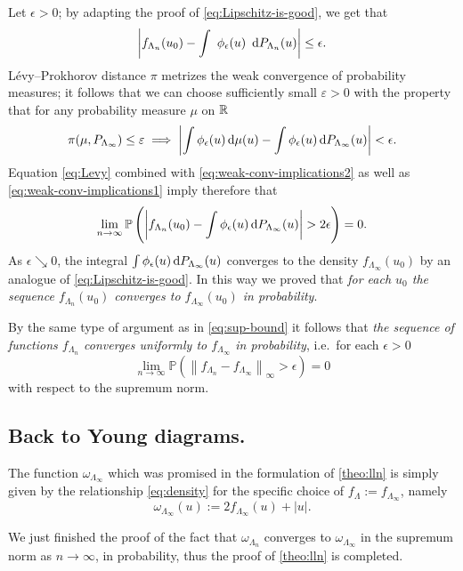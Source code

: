 \documentclass[12pt,usenames,dvipsnames,svgnames,table]{amsart}
\begin{document}
\medskip

Let $\epsilon>0$; by adapting the proof of \eqref{eq:Lipschitz-is-good}, we get that
\begin{equation}
\label{eq:weak-conv-implications1}
\left| f_{\Lambda_n}(u_0) - \int\ \phi_\epsilon(u)\ \dif  P_{\Lambda_n}(u) \right| 
\leq \epsilon.  
\end{equation}
Lévy--Prokhorov distance $\pi$ metrizes the weak convergence of probability measures;
it follows that we can choose sufficiently small $\varepsilon>0$ 
with the property that for any probability measure
$\mu$ on $\mathbb{R}$
\begin{equation}
\label{eq:weak-conv-implications2}
\pi(\mu, P_{\Lambda_\infty})\leq \varepsilon \implies 
\left| \int \phi_\epsilon(u) \dif \mu(u)-  \int \phi_\epsilon(u) \dif P_{\Lambda_\infty}(u) \right| <\epsilon.
\end{equation}
Equation \eqref{eq:Levy} combined with \eqref{eq:weak-conv-implications2}
as well as \eqref{eq:weak-conv-implications1}
imply therefore that
\[ \lim_{n\to\infty} 
\mathbb{P} \left( \left| f_{\Lambda_n}(u_0) - \int \phi_\epsilon(u) \dif P_{\Lambda_\infty}(u) \right| > 2\epsilon
\right) = 0.
\]
As $\epsilon\searrow 0$, the integral $\int \phi_\epsilon(u) \dif P_{\Lambda_\infty}(u) $ 
converges to the density $f_{\Lambda_\infty}(u_0)$ by an analogue of \eqref{eq:Lipschitz-is-good}.
In this way we proved that \emph{for each $u_0$ 
	the sequence $f_{\Lambda_n}(u_0)$ converges to
	$f_{\Lambda_\infty}(u_0)$ in probability}.

By the same type of argument as in \eqref{eq:sup-bound}
it follows that 
\emph{the sequence of functions $f_{\Lambda_n}$ converges uniformly to $f_{\Lambda_\infty}$ in probability}, 
i.e.~for each $\epsilon>0$
\[\lim_{n\to\infty} \mathbb{P} \left( \left\| f_{\Lambda_n} - f_{\Lambda_\infty} \right\|_{\infty} > \epsilon \right) = 0 \]
with respect to the supremum norm.

\subsection{Back to Young diagrams.}
The function $\omega_{\Lambda_\infty}$ which was promised in the formulation of \cref{theo:lln}
is simply given by the relationship \eqref{eq:density} for the specific choice of 
$f_{\Lambda}:=f_{\Lambda_\infty}$, namely
\[ \omega_{\Lambda_\infty}(u):= 2 f_{\Lambda_\infty}(u) + |u|.\]

We just finished the proof of
the fact that $\omega_{\Lambda_n}$ converges to
$\omega_{\Lambda_\infty}$ in the supremum norm as $n
\to \infty$, in probability, thus the proof of \cref{theo:lln} is completed.
\end{document}
